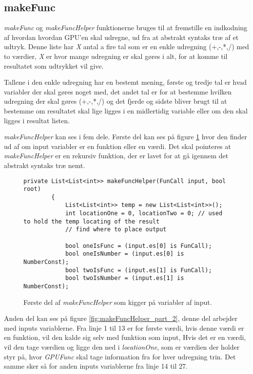 \subsection{makeFunc}
\textit{makeFunc} og \textit{makeFuncHelper} funktionerne bruges til at fremstille en indkodning af hvordan hvordan GPU'en skal udregne, ud fra at abstrakt syntaks træ af et udtryk. Denne liste har \textit{X} antal a fire tal som er en enkle udregning (+,-,*,/) med to værdier, \textit{X} er hvor mange udregning er skal gøres i alt, for at komme til resultatet som udtrykket vil give.

Tallene i den enkle udregning har en bestemt mening, første og tredje tal er hvad variabler der skal gøres noget med, det andet tal er for at bestemme hvilken udregning der skal gøres (+,-,*,/) og det fjerde og sidste bliver brugt til at bestemme om resultatet skal lige ligges i en midlertidig variable eller om den skal ligges i resultat listen.

\textit{makeFuncHelper} kan ses i fem dele. Første del kan ses på figure \ref{fig:makeFuncHelper_part_1} hvor den finder ud af om input variabler er en funktion eller en værdi. Det skal pointeres at \textit{makeFuncHelper} er en rekursiv funktion, der er lavet for at gå igennem det abstrakt syntaks træ nemt.

\begin{figure}[!ht]
    \centering
    \lstset{style=sharpc}
	\begin{lstlisting}
private List<List<int>> makeFuncHelper(FunCall input, bool root)
        {
            List<List<int>> temp = new List<List<int>>();
            int locationOne = 0, locationTwo = 0; // used to hold the temp locating of the result
            // find where to place output

            bool oneIsFunc = (input.es[0] is FunCall);
            bool oneIsNumber = (input.es[0] is NumberConst);
            bool twoIsFunc = (input.es[1] is FunCall);
            bool twoIsNumber = (input.es[1] is NumberConst);
	\end{lstlisting}
    \caption{Første del af \textit{makeFuncHelper} som kigger på variabler af input.}
    \label{fig:makeFuncHelper_part_1}
\end{figure}

Anden del kan ses på figure \ref{fig:makeFuncHelper_part_2}, denne del arbejder med inputs variablerne. Fra linje 1 til 13 er for første værdi, hvis denne værdi er en funktion, vil den kalde sig selv med funktion som input, Hvis det er en værdi, vil den tage værdien og ligge den ned i \textit{locationOne}, som er værdien der holder styr på, hvor \textit{GPUFunc} skal tage information fra for hver udregning trin. Det samme sker så for anden inputs variablerne fra linje 14 til 27.

